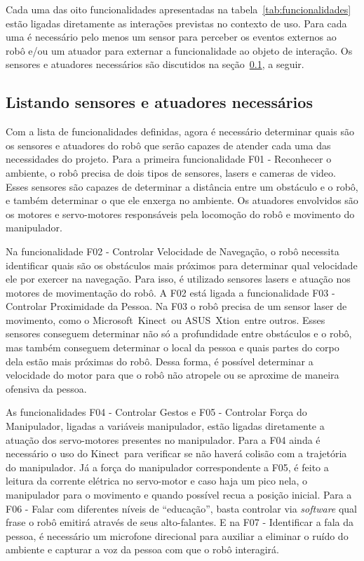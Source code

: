 Cada uma das oito funcionalidades apresentadas na tabela~\ref{tab:funcionalidades} estão ligadas diretamente as interações previstas no contexto de uso. Para cada uma é necessário pelo menos um sensor para perceber os eventos externos ao robô e/ou um atuador para externar a funcionalidade ao objeto de interação. Os sensores e atuadores necessários são discutidos na seção~\ref{sec:sensoresatuadores}, a seguir.

\subsection{Listando sensores e atuadores necessários}
\label{sec:sensoresatuadores}
Com a lista de funcionalidades definidas, agora é necessário determinar quais são os sensores e atuadores do robô que serão capazes de atender cada uma das necessidades do projeto. Para a primeira funcionalidade F01 - Reconhecer o ambiente, o robô precisa de dois tipos de sensores, lasers e cameras de video. Esses sensores são capazes de determinar a distância entre um obstáculo e o robô, e também determinar o que ele enxerga no ambiente. Os atuadores envolvidos são os motores e servo-motores responsáveis pela locomoção do robô e movimento do manipulador.

Na funcionalidade F02 - Controlar Velocidade de Navegação, o robô necessita identificar quais são os obstáculos mais próximos para determinar qual velocidade ele por exercer na navegação. Para isso, é utilizado sensores lasers e atuação nos motores de movimentação do robô. A F02 está ligada a funcionalidade F03 - Controlar Proximidade da Pessoa. Na F03 o robô precisa de um sensor laser de movimento, como o Microsoft\textregistered\ Kinect\textregistered\ ou ASUS\textregistered\ Xtion\textregistered\, entre outros. Esses sensores conseguem determinar não só a profundidade entre obstáculos e o robô, mas também conseguem determinar o local da pessoa e quais partes do corpo dela estão mais próximas do robô. Dessa forma, é possível determinar a velocidade do motor para que o robô não atropele ou se aproxime de maneira ofensiva da pessoa.

As funcionalidades F04 - Controlar Gestos e F05 - Controlar Força do Manipulador, ligadas a variáveis manipulador, estão ligadas diretamente a atuação dos servo-motores presentes no manipulador. Para a F04 ainda é necessário o uso do Kinect\textregistered\ para verificar se não haverá colisão com a trajetória do manipulador. Já a força do manipulador correspondente a F05, é feito a leitura da corrente elétrica no servo-motor e caso haja um pico nela, o manipulador para o movimento e quando possível recua a posição inicial. Para a F06 - Falar com diferentes níveis de ``educação'', basta controlar via \emph{software} qual frase o robô emitirá através de seus alto-falantes. E na F07 - Identificar a fala da pessoa, é necessário um microfone direcional para auxiliar a eliminar o ruído do ambiente e capturar a voz da pessoa com que o robô interagirá.

